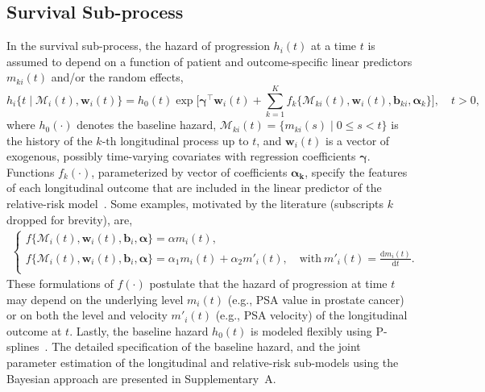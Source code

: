 \documentclass[AMA,STIX1COL]{WileyNJD-v2}
\begin{document}
\subsection{Survival Sub-process}
\label{subsec:surival_sub_model}
In the survival sub-process, the hazard of progression $h_i(t)$ at a time $t$ is assumed to depend on a function of patient and outcome-specific linear predictors $m_{ki}(t)$ and/or the random effects,
\begin{equation*}
\label{eq:rel_risk_model}
h_i\big\{t \mid \mathcal{M}_i(t), \boldsymbol{w}_i(t)\big\} = h_0(t) \exp\Big[\boldsymbol{\gamma}^{\top}\boldsymbol{w}_i(t) + \sum_{k=1}^{K} f_{k} \big\{ \mathcal{M}_{ki}(t), \boldsymbol{w}_i(t), \boldsymbol{b}_{ki}, \boldsymbol{\alpha}_{k} \big\}\Big], \quad t>0,
\end{equation*}
where $h_0(\cdot)$ denotes the baseline hazard, $\mathcal{M}_{ki}(t)=\{m_{ki}(s) \mid 0 \leq s < t \}$ is the history of the ${k\mbox{-th}}$ longitudinal process up to $t$, and $\boldsymbol{w}_i(t)$ is a vector of exogenous, possibly time-varying covariates with regression coefficients $\boldsymbol{\gamma}$. Functions $f_{k}(\cdot)$, parameterized by vector of coefficients $\boldsymbol{\alpha_{k}}$, specify the features of each longitudinal outcome that are included in the linear predictor of the relative-risk model~\citep{brown2009assessing,rizopoulos2012joint,taylor2013real}. Some examples, motivated by the literature (subscripts $k$ dropped for brevity), are,
\begin{eqnarray*}
\left \{
\begin{array}{l}
f\big\{\mathcal{M}_{i}(t), \boldsymbol{w}_i(t), \boldsymbol{b}_{i}, \boldsymbol{\alpha} \big\} = \alpha m_{i}(t),\\
f\big\{ \mathcal{M}_{i}(t), \boldsymbol{w}_i(t), \boldsymbol{b}_{i}, \boldsymbol{\alpha}\big\} = \alpha_1 m_{i}(t) + \alpha_2 m'_{i}(t),\quad \text{with}\  m'_{i}(t) = \frac{\mathrm{d}{m_{i}(t)}}{\mathrm{d}{t}}.\\
\end{array}
\right.
\end{eqnarray*}
These formulations of $f(\cdot)$ postulate that the hazard of progression at time $t$ may depend on the underlying level $m_i(t)$ (e.g., PSA value in prostate cancer) or on both the level and velocity $m'_i(t)$ (e.g., PSA velocity) of the longitudinal outcome at $t$. Lastly, the baseline hazard $h_0(t)$ is modeled flexibly using P-splines~\citep{eilers1996flexible}. The detailed specification of the baseline hazard, and the joint parameter estimation of the longitudinal and relative-risk sub-models using the Bayesian approach are presented in Supplementary~A.
\end{document}
